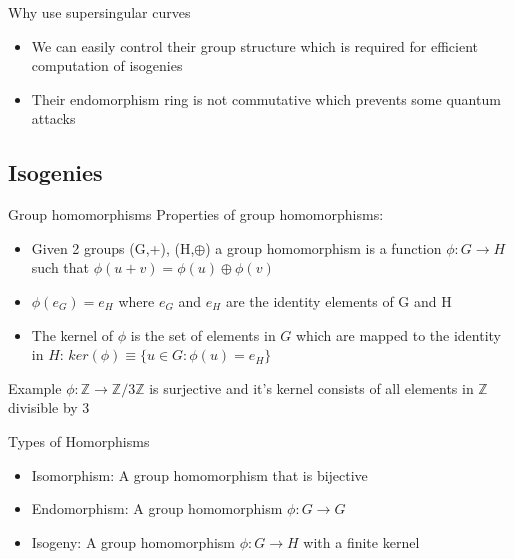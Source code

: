 \documentclass{beamer}
\begin{document}
\begin{frame}{Why use supersingular curves}
\begin{itemize}[\textbullet]
	\item We can easily control their group structure which is required for efficient computation of isogenies
	\item Their endomorphism ring is not commutative which  prevents some quantum attacks
\end{itemize}
\end{frame}




\subsection{Isogenies}
\begin{frame}{Group homomorphisms}
Properties of group homomorphisms:
\begin{itemize}[\textbullet]
	\item Given 2 groups (G,+), (H,$\oplus$) a group homomorphism is a function $\phi: G \to H$ such that $\phi(u + v) = \phi(u) \oplus \phi(v)$ \pause
	\item $\phi(e_G) = e_H$ where $e_G$ and $e_H$ are the identity elements of G and H\pause
	\item The kernel of $\phi$ is the set of elements in $G$ which are mapped to the identity in $H$:
	$ker(\phi) \equiv \{u\in G:\phi(u)=e_H\}$
\end{itemize}
	 
	
	\begin{block}{Example}
		$\phi: \mathbb{Z}\to\mathbb{Z}/3\mathbb{Z}$ is surjective and it's kernel consists of all elements in $\mathbb{Z}$ divisible by 3
		
		
	\end{block}
\end{frame}
\begin{frame}{Types of Homorphisms}
	\begin{itemize}[\textbullet]
		\item Isomorphism: A group homomorphism that is bijective \pause
		\item Endomorphism: A group homomorphism $\phi: G \to G$\pause
		\item Isogeny: A group homomorphism $\phi : G \to H$ with a finite kernel
	\end{itemize}

\end{frame}
\end{document}

